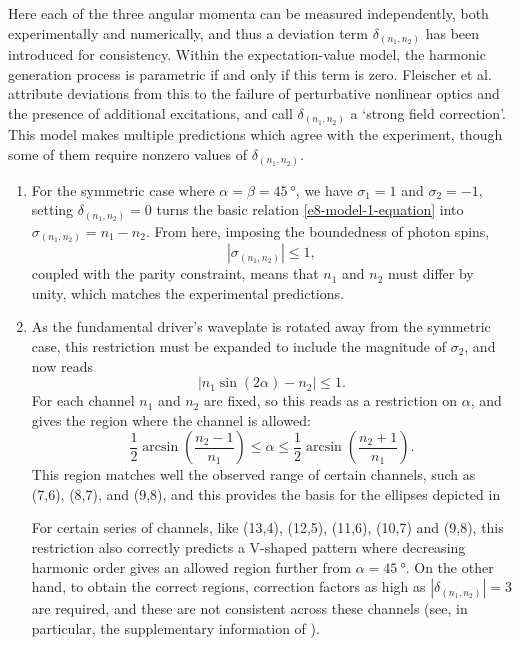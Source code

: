 Here each of the three angular momenta can be measured independently, both experimentally and numerically, and thus a deviation term $\delta_{(n_1,n_2)}$ has been introduced for consistency. Within the expectation-value model, the harmonic generation process is parametric if and only if this term is zero. Fleischer et al. attribute deviations from this to the failure of perturbative nonlinear optics and the presence of additional excitations, and call $\delta_{(n_1,n_2)}$ a `strong field correction'. This model makes multiple predictions which agree with the experiment, though some of them require nonzero values of $\delta_{(n_1,n_2)}$.

\begin{enumerate}[label=(\roman*)]

 \item
 For the symmetric case where $\alpha=\beta=\SI{45}{\degree}$, we have $\sigma_1=1$ and $\sigma_2=-1$, setting \mbox{$\delta_{(n_1,n_2)}=0$} turns the basic relation \eqref{e8-model-1-equation} into $\sigma_{(n_1,n_2)}=n_1-n_2$. From here, imposing the boundedness of photon spins, 
 \begin{equation}
 |\sigma_{(n_1,n_2)}|\leq 1,
 \label{e8-photon-spin-boundedness}
 \end{equation} coupled with the parity constraint, means that $n_1$ and $n_2$ must differ by unity, which matches the experimental predictions.
 
 \item
 As the fundamental driver's waveplate is rotated away from the symmetric case, this restriction must be expanded to include the magnitude of $\sigma_2$, and now reads
 \begin{equation}
 |n_1\sin(2\alpha) - n_2| \leq 1.
 \label{e8-channel-existence-region}
 \end{equation}
 For each channel $n_1$ and $n_2$ are fixed, so this reads as a restriction on $\alpha$, and gives the region where the channel is allowed:
 \begin{equation}
 \frac12\arcsin\left(\frac{n_2-1}{n_1}\right)\leq\alpha\leq\frac12\arcsin\left(\frac{n_2+1}{n_1}\right).
 \label{e8-channel-existence-region-unbundled}
 \end{equation}
 This region matches well the observed range of certain channels, such as (7,6), (8,7), and (9,8), and this provides the basis for the ellipses depicted in 
 
 For certain series of channels, like (13,4), (12,5), (11,6), (10,7) and (9,8), this restriction also correctly predicts a V-shaped pattern where decreasing harmonic order gives an allowed region further from $\alpha=\SI{45}{\degree}$. On the other hand, to obtain the correct regions, correction factors as high as $|\delta_{(n_1,n_2)}|=3$ are required, and these are not consistent across these channels (see, in particular, the supplementary information of ).
 

\end{enumerate}
